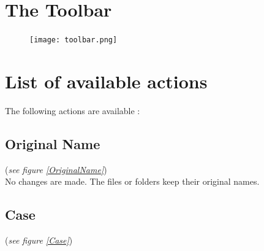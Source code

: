 \documentclass[11pt, a4paper]{scrartcl}
\begin{document}
\section{The Toolbar}
\begin{figure}[!ht]
        \centering
        \texttt{[image: toolbar.png]}
        \label{toolbar}
\end{figure}

\section{List of available actions}
The following actions are available :

\subsection*{Original Name}
(\emph{see figure \ref{OriginalName}})\\

No changes are made. The files or folders keep their original names.

\subsection*{Case}
(\emph{see figure \ref{Case}})\\
\end{document}
